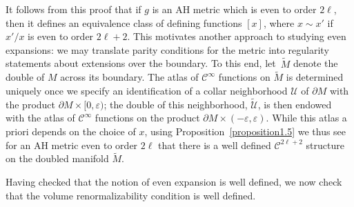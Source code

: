 \documentclass[11pt]{article}
\numberwithin{equation}{section}
\renewcommand{\epsilon}{\varepsilon}
\newcommand{\wt}{\widetilde}
\newcommand{\del}{\partial}
\newcommand{\calU}{\mathcal U}
\newcommand{\calC}{\mathcal C}
\begin{document}
It follows from this proof that if $g$ is an AH metric which is even to order $2\ell$, then it defines an equivalence class of defining functions $[x]$, where $x \sim x'$ if $x'/x$ is even to order $2\ell+2$. This motivates another approach to studying even expansions: we may translate parity conditions for the metric into regularity statements about extensions over the boundary. To this end, let~$\wt{M}$ denote the double of $M$ across its boundary. The
atlas of $\calC^\infty$ functions on $\wt{M}$ is determined uniquely once we specify an identification of a collar neighborhood
$\calU$ of $\del M$ with the product $\del M \times [0,\epsilon)$; the double of this neighborhood, $\wt{\calU}$, is then
endowed with the atlas of $\calC^\infty$ functions on the product $\del M \times (-\epsilon, \epsilon)$. While this atlas a priori depends on the choice of $x$, using Proposition~\ref{proposition1.5} we thus see for an AH metric even to order $2 \ell$ that there is a well defined $\calC^{2\ell+2}$ structure on the doubled manifold $\wt{M}$.

Having checked that the notion of even expansion is well defined, we now check that the volume renormalizability condition is well defined.
\end{document}
